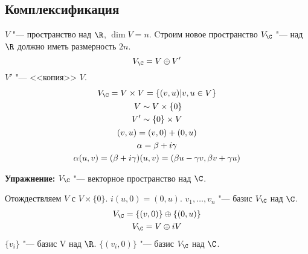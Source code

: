 \subsection{Комплексификация}

$V$ "--- пространство над $\R$, $\dim V = n$.
Cтроим новое пространство $V_{\C}$ "--- над $\R$ должно иметь размерность $2n$.
\[ V_{\C} = V \oplus V' \]
$V'$ "--- <<копия>> $V$.
\begin{gather*}
	V_{\C} = V \times V = \{(v, u)| v, u \in V\} \\
	\begin{aligned}
		V  &\sim V \times \{0\} \\
		V' &\sim \{0\} \times V
	\end{aligned} \\
	(v, u) = (v, 0) + (0, u) \\
	\alpha = \beta + i \gamma \\
	\alpha(u, v) = (\beta + i \gamma)(u, v) = (\beta u - \gamma v, \beta v + \gamma u)
\end{gather*}

\textbf{Упражнение: }
$V_{\C}$ "--- векторное пространство над $\C$.

Отождествляем $V$ с $V \times \{0\}$.
$i(u, 0) = (0, u)$.
$v_1, \dots, v_n$ "--- базис $V_{\C}$ над $\C$.
\begin{gather*}
	V_{\C} = \{(v, 0)\} \oplus \{(0, u)\} \\
	V_{\C} = V \oplus iV
\end{gather*}
$\{v_i\}$ "--- базис V над $\R$.
$\{(v_i, 0)\}$ "--- базис $V_{\C}$ над $\C$.

